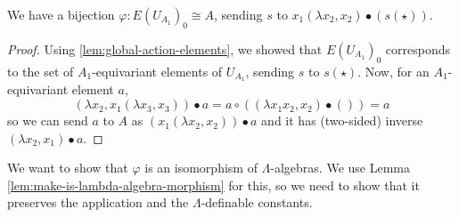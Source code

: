 \begin{remark}





\end{remark}

\begin{lemma}
  We have a bijection $ \varphi: E(U_{A_1})_0 \cong A $, sending $ s $ to $ x_1 (\lambda x_2, x_2) \bullet (s(\star)) $.
\end{lemma}
\begin{proof}
  Using \ref{lem:global-action-elements}, we showed that $ E(U_{A_1})_0 $ corresponds to the set of $ A_1 $-equivariant elements of $ U_{A_1} $, sending $ s $ to $ s(\star) $. Now, for an $ A_1 $-equivariant element $ a $,
  \[ (\lambda x_2, x_1 (\lambda x_3, x_3)) \bullet a = a \circ ((\lambda x_1 x_2, x_2) \bullet ()) = a \]
  so we can send $ a $ to $ A $ as $ (x_1 (\lambda x_2, x_2)) \bullet a $ and it has (two-sided) inverse $ (\lambda x_2, x_1) \bullet a $.
\end{proof}

We want to show that $ \varphi $ is an isomorphism of $ \Lambda $-algebras. We use Lemma \ref{lem:make-is-lambda-algebra-morphism} for this, so we need to show that it preserves the application and the $ \Lambda $-definable constants.


